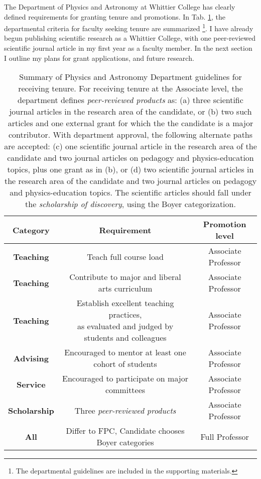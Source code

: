 \documentclass[../../main.tex]{subfiles}
\begin{document}
The Department of Physics and Astronomy at Whittier College has clearly defined requirements for granting tenure and promotions.  In Tab. \ref{tab:tenure}, the departmental criteria for faculty seeking tenure are summarized \footnote{The departmental guidelines are included in the supporting materials.}.  I have already begun publishing scientific research as a Whittier College, with one peer-reviewed scientific journal article in my first year as a faculty member.  In the next section I outline my plans for grant applications, and future research.

\begin{table}
\centering
\begin{tabular}{|c|c|c|}
\hline \hline
Category & Requirement & Promotion level \\ \hline
\textbf{Teaching} & Teach full course load & Associate Professor \\ \hline
\textbf{Teaching} & Contribute to major and liberal arts curriculum & Associate Professor \\ \hline
\textbf{Teaching} & \makecell{Establish excellent teaching practices, \\ as evaluated and judged by students and colleagues} & Associate Professor \\ \hline
\textbf{Advising} & Encouraged to mentor at least one cohort of students & Associate Professor \\ \hline
\textbf{Service} & Encouraged to participate on major committees & Associate Professor \\ \hline
\textbf{Scholarship} & Three \textit{peer-reviewed products} & Associate Professor \\ \hline \hline
\textbf{All} & Differ to FPC, Candidate chooses Boyer categories & Full Professor \\ \hline
\end{tabular}
\caption{\label{tab:tenure} Summary of Physics and Astronomy Department guidelines for receiving tenure.  For receiving tenure at the Associate level, the department defines \textit{peer-reviewed products} as: (a) three scientific journal articles in the research area of the candidate, or (b) two such articles and one external grant for which the the candidate is a major contributor.  With department approval, the following alternate paths are accepted: (c) one scientific journal article in the research area of the candidate and two journal articles on pedagogy and physics-education topics, plus one grant as in (b), or (d) two scientific journal articles in the research area of the candidate and two journal articles on pedagogy and physics-education topics.  The scientific articles should fall under the \textit{scholarship of discovery}, using the Boyer categorization.}
\end{table}
\end{document}
